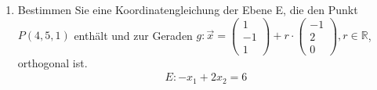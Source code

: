 \documentclass[12pt]{article}
\begin{document}
\begin{enumerate}[start=1,label={\bfseries Frage \arabic*:},leftmargin=1in]
    \item Bestimmen Sie eine Koordinatengleichung der Ebene E, die den Punkt \\
    $P(4,5,1)$ enthält und zur Geraden $g:\Vec{x}=\begin{pmatrix} 1 \\ -1 \\ 1 \end{pmatrix} + r \cdot 
    \begin{pmatrix} -1 \\ 2 \\ 0 \end{pmatrix}, r \in \mathbb{R}$, orthogonal ist.
    \begin{align*}
        E : -x_1 + 2x_2 = 6
    \end{align*}

\end{enumerate}
\end{document}
